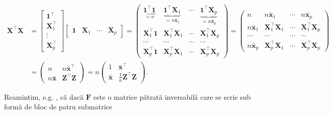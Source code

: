 \documentclass[]{article}
\begin{document}
\begin{align*}
  \boldsymbol X^\intercal \boldsymbol X &= \begin{bmatrix}\mathbf{1}^\intercal \\ \boldsymbol X_1^\intercal \\ \vdots \\ \boldsymbol X_p^\intercal\end{bmatrix}\begin{bmatrix}\mathbf{1} & \boldsymbol X_1 & \cdots &\boldsymbol X_p\end{bmatrix} = \begin{pmatrix}\underbrace{\mathbf{1}^\intercal\mathbf{1}}_{=n} & \underbrace{\mathbf{1}^\intercal\boldsymbol X_1}_{=n\bar{\boldsymbol x}_1} & \cdots & \underbrace{\mathbf{1}^\intercal\boldsymbol X_p}_{=n\bar{\boldsymbol x}_p}\\
  \boldsymbol X_1^\intercal\mathbf{1} & \boldsymbol X_1^\intercal\boldsymbol X_1 & \cdots & \boldsymbol X_1^\intercal \boldsymbol X_p\\
  \cdots & \cdots & \cdots & \cdots \\
  \boldsymbol X_p^\intercal\mathbf{1} & \boldsymbol X_p^\intercal\boldsymbol X_1 & \cdots & \boldsymbol X_p^\intercal \boldsymbol X_p\end{pmatrix} = \begin{pmatrix}n & n\bar{\boldsymbol x}_1 & \cdots & n\bar{\boldsymbol x}_p\\
  n\bar{\boldsymbol x}_1 & \boldsymbol X_1^\intercal\boldsymbol X_1 & \cdots & \boldsymbol X_1^\intercal \boldsymbol X_p\\ 
  \cdots & \cdots & \cdots & \cdots\\
  n\bar{\boldsymbol x}_p & \boldsymbol X_p^\intercal\boldsymbol X_1 & \cdots & \boldsymbol X_p^\intercal \boldsymbol X_p\end{pmatrix}\\
  &= \begin{pmatrix}n & n\bar{\boldsymbol x}^\intercal\\
  n\bar{\boldsymbol x} & \boldsymbol Z^\intercal \boldsymbol Z\end{pmatrix} = n\begin{pmatrix}1 & \bar{\boldsymbol x}^\intercal\\ \bar{\boldsymbol x} & \frac{1}{n}\boldsymbol Z^\intercal \boldsymbol Z\end{pmatrix}.
\end{align*}

Reamintim, e.g. \citep{Searle1981}, că dacă \(\boldsymbol F\) este o
matrice pătrată inversabilă care se scrie sub formă de bloc de patru
submatrice
\end{document}
